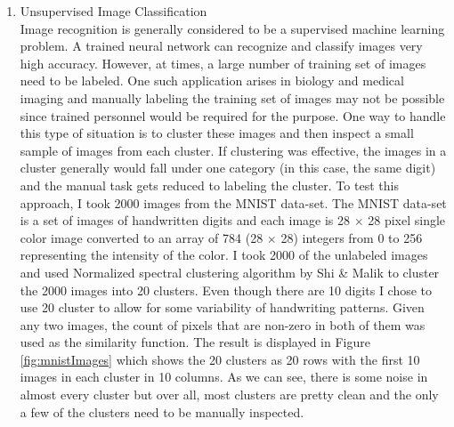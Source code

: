 \documentclass[10pt,a4paper, nocenter]{report}
\begin{document}
\begin{enumerate}
        \item{Unsupervised Image Classification}\\
        Image recognition is generally considered to be a supervised machine learning problem. A trained neural network can recognize and classify images very high accuracy. However, at times, a large number of training set of images need to be labeled. One such application arises in biology and medical imaging and manually labeling the training set of images may not be possible since trained personnel would be required for the purpose. One way to handle this type of situation is to cluster these images and then inspect a small sample of images from each cluster. If clustering was effective, the images in a cluster generally would fall under one category (in this case, the same digit) and the manual task gets reduced to labeling the cluster. To test this approach, I took 2000 images from the MNIST data-set. The MNIST data-set is a set of images of handwritten digits and each image is 28 $\times$ 28 pixel single color image converted to an array of 784 (28 $\times$ 28) integers from 0 to 256 representing the intensity of the color. I took 2000 of the unlabeled images and used Normalized spectral clustering algorithm by Shi \& Malik \cite{Shi-Malik-maxcut-00} to cluster the 2000 images into 20 clusters. Even though there are 10 digits I chose to use 20 cluster to allow for some variability of handwriting patterns. Given any two images, the count of pixels that are non-zero in both of them was used as the similarity function. The result is displayed in Figure \ref{fig:mnistImages} which shows the 20 clusters as 20 rows with the first 10 images in each cluster in 10 columns. As we can see, there is some noise in almost every cluster but over all, most clusters are pretty clean and the only a few of the clusters need to be manually inspected.
        \begin{figure}[h]
            \begin{center}

\end{center}
\end{figure}
\end{enumerate}
\end{document}
